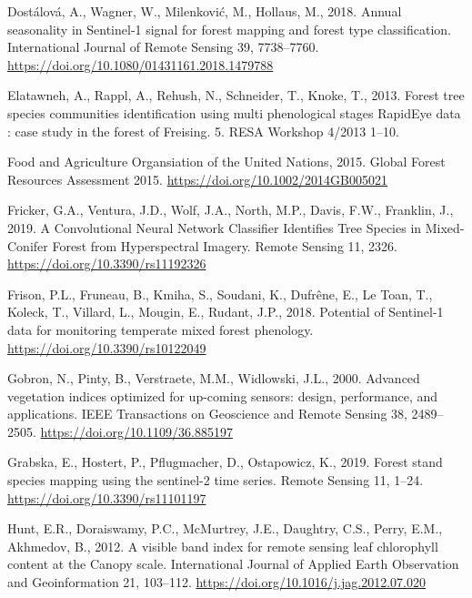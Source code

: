 \documentclass[]{article}
\begin{document}
\leavevmode\hypertarget{ref-Dostalova2018}{}%
Dostálová, A., Wagner, W., Milenković, M., Hollaus, M., 2018. Annual
seasonality in Sentinel-1 signal for forest mapping and forest type
classification. International Journal of Remote Sensing 39, 7738--7760.
\url{https://doi.org/10.1080/01431161.2018.1479788}

\leavevmode\hypertarget{ref-Elatawneh2013}{}%
Elatawneh, A., Rappl, A., Rehush, N., Schneider, T., Knoke, T., 2013.
Forest tree species communities identification using multi phenological
stages RapidEye data : case study in the forest of Freising. 5. RESA
Workshop 4/2013 1--10.

\leavevmode\hypertarget{ref-FoodandAgricultureOrgansiationoftheUnitedNations2015}{}%
Food and Agriculture Organsiation of the United Nations, 2015. Global
Forest Resources Assessment 2015.
\url{https://doi.org/10.1002/2014GB005021}

\leavevmode\hypertarget{ref-Fricker2019}{}%
Fricker, G.A., Ventura, J.D., Wolf, J.A., North, M.P., Davis, F.W.,
Franklin, J., 2019. A Convolutional Neural Network Classifier Identifies
Tree Species in Mixed-Conifer Forest from Hyperspectral Imagery. Remote
Sensing 11, 2326. \url{https://doi.org/10.3390/rs11192326}

\leavevmode\hypertarget{ref-Frison2018}{}%
Frison, P.L., Fruneau, B., Kmiha, S., Soudani, K., Dufrêne, E., Le Toan,
T., Koleck, T., Villard, L., Mougin, E., Rudant, J.P., 2018. Potential
of Sentinel-1 data for monitoring temperate mixed forest phenology.
\url{https://doi.org/10.3390/rs10122049}

\leavevmode\hypertarget{ref-Gobron2000}{}%
Gobron, N., Pinty, B., Verstraete, M.M., Widlowski, J.L., 2000. Advanced
vegetation indices optimized for up-coming sensors: design, performance,
and applications. IEEE Transactions on Geoscience and Remote Sensing 38,
2489--2505. \url{https://doi.org/10.1109/36.885197}

\leavevmode\hypertarget{ref-Grabska2019}{}%
Grabska, E., Hostert, P., Pflugmacher, D., Ostapowicz, K., 2019. Forest
stand species mapping using the sentinel-2 time series. Remote Sensing
11, 1--24. \url{https://doi.org/10.3390/rs11101197}

\leavevmode\hypertarget{ref-Hunt2012}{}%
Hunt, E.R., Doraiswamy, P.C., McMurtrey, J.E., Daughtry, C.S., Perry,
E.M., Akhmedov, B., 2012. A visible band index for remote sensing leaf
chlorophyll content at the Canopy scale. International Journal of
Applied Earth Observation and Geoinformation 21, 103--112.
\url{https://doi.org/10.1016/j.jag.2012.07.020}
\end{document}
